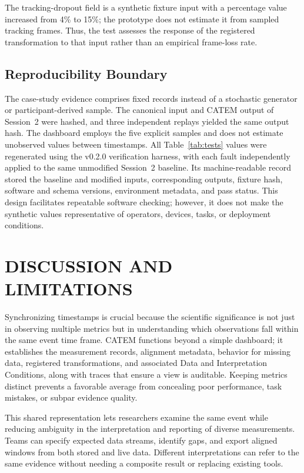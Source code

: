 \documentclass[letterpaper,10pt,conference]{ieeeconf}
\begin{document}
The tracking-dropout field is a synthetic fixture input with a percentage value increased from 4\% to 15\%; the prototype does not estimate it from sampled tracking frames. Thus, the test assesses the response of the registered transformation to that input rather than an empirical frame-loss rate.

\subsection{Reproducibility Boundary}

The case-study evidence comprises fixed records instead of a stochastic generator or participant-derived sample. The canonical input and CATEM output of Session~2 were hashed, and three independent replays yielded the same output hash. The dashboard employs the five explicit samples and does not estimate unobserved values between timestamps. All Table~\ref{tab:tests} values were regenerated using the v0.2.0 verification harness, with each fault independently applied to the same unmodified Session~2 baseline. Its machine-readable record stored the baseline and modified inputs, corresponding outputs, fixture hash, software and schema versions, environment metadata, and pass status. This design facilitates repeatable software checking; however, it does not make the synthetic values representative of operators, devices, tasks, or deployment conditions.

\section{DISCUSSION AND LIMITATIONS}

Synchronizing timestamps is crucial because the scientific significance is not just in observing multiple metrics but in understanding which observations fall within the same event time frame. CATEM functions beyond a simple dashboard; it establishes the measurement records, alignment metadata, behavior for missing data, registered transformations, and associated Data and Interpretation Conditions, along with traces that ensure a view is auditable. Keeping metrics distinct prevents a favorable average from concealing poor performance, task mistakes, or subpar evidence quality.

This shared representation lets researchers examine the same event while reducing ambiguity in the interpretation and reporting of diverse measurements. Teams can specify expected data streams, identify gaps, and export aligned windows from both stored and live data. Different interpretations can refer to the same evidence without needing a composite result or replacing existing tools.
\end{document}
